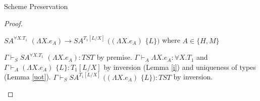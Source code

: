 \begin{theorem}{Scheme Preservation}
\begin{proof}

\begin{case}
$SA^{\forall X.T_{1}}$ $(\Lambda X.e_{A})\rightarrow SA^{T_{1}[L/X]}$ $((\Lambda X.e_{A})$ $\lbrace L\rbrace)$ where $A\in\lbrace H,M\rbrace$

$\Gamma\vdash_{S}SA^{\forall X.T_{1}}$ $(\Lambda X.e_{A}):TST$ by premise.  $\Gamma\vdash_{A}\Lambda X.e_{A}:\forall X.T_{1}$ and $\Gamma\vdash_{A}(\Lambda X.e_{A})$ $\lbrace L\rbrace:T_{1}[L/X]$ by inversion (Lemma \ref{i}) and uniqueness of types (Lemma \ref{uot}).  $\Gamma\vdash_{S}SA^{T_{1}[L/X]}$ $((\Lambda X.e_{A})$ $\lbrace L\rbrace):TST$ by inversion.
\end{case}

\end{proof}

\end{theorem}
